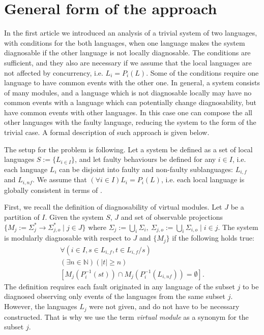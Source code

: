 \documentclass[a4paper, 10pt, conference]{ieeeconf}
\begin{document}
\section{General form of the approach}
\label{sec:General}
In the first article we introduced an analysis of a trivial system of two
languages, with conditions for the both languages, when one language makes the
system diagnosable if the other language is not locally diagnosable.
The conditions are sufficient, and they also are necessary if we assume that the
local languages are not affected by concurrency, i.e. $L_i = P_i(L)$. Some of
the conditions require one language to have common events with the other one. In
general, a system consists of many modules, and a language which is not
diagnosable locally may have no common events with a language which can
potentially change diagnosability, but have common events with other languages.
In this case one can compose the all other languages with the faulty language,
reducing the system to the form of the trivial case. A formal description of
such approach is given below.

The setup for the problem is following. Let a system be defined as a set of
local languages $S := \{L_{i\in I}\}$, and let faulty behaviours be defined for
any $i \in I$, i.e. each language $L_i$ can be disjoint into faulty and
non-faulty sublanguages: $L_{i,f}$ and $L_{i,nf}$. We assume that $(\forall i
\in I) L_i = P_i(L)$, i.e. each local language is globally consistent in terms
of \cite{su_global_2005}.

First, we recall the definition of diagnosability of virtual modules. Let $J$ be
a partition of $I$. Given the system $S$, $J$ and set of observable
projections $\{M_j := \Sigma_j^* \rightarrow \Sigma_{j,o}^* \mid j \in J \}$
where $\Sigma_j := \bigcup_i \Sigma_i,~ 
	\Sigma_{j,o} := \bigcup_i \Sigma_{i,o} \mid 
	i\in j$. 
The system is modularly diagnosable with respect to $J$ and $\{M_j\}$ 
if the following holds true:
\begin{equation}
	\begin{array}{l}
		\forall(i \in I, s \in L_{i,f}, t \in L_{i,f}/s)
		\\
		(\exists n \in \mathbb{N})
		(|t| \geq n)
		\\
		\left[ M_j(P_i^{-1}(st)) \cap M_j(P_i^{-1}(L_{i,nf})) = \emptyset \right].
	\end{array}
\end{equation}
The definition requires each fault originated in any language of the subset $j$
to be diagnosed observing only events of the languages from the same subset $j$.
However, the languages $L_j$ were not given, and do not have to be necessary
constructed. That is why we use the term \emph{virtual module} as a synonym for
the subset $j$.
\end{document}

